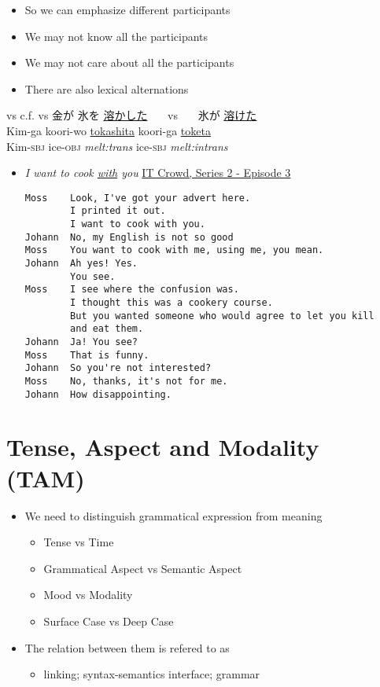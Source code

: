 \documentclass[a4paper,landscape,headrule,footrule,xetex]{foils}
\begin{document}
\begin{itemize}
\item So we can emphasize different participants
\item We may not know all the participants
\item We may not care about all the participants
\item There are also lexical alternations
\end{itemize}
\begin{exe}
\ex {} vs 
\ex c.f.  vs 
\ex \glll 金が 氷を \ul{溶かした}  {~~~vs~~~}  氷が \ul{溶けた} \\ 
Kim-ga koori-wo \ul{tokashita}  {} koori-ga \ul{toketa} \\
  Kim-\textsc{sbj} ice-\textsc{obj} \textit{melt:trans} 
{} ice-\textsc{sbj} \textit{melt:intrans} \\
\end{exe}



\begin{itemize}
\item \textit{I want to cook \ul{with} you}  \href{https://www.youtube.com/watch?v=gOE-q20RcDM}{IT Crowd, Series 2 - Episode 3}
\begin{verbatim}
Moss    Look, I've got your advert here.
        I printed it out.
        I want to cook with you.
Johann  No, my English is not so good 
Moss    You want to cook with me, using me, you mean.
Johann  Ah yes! Yes.
        You see.
Moss    I see where the confusion was.
        I thought this was a cookery course.
        But you wanted someone who would agree to let you kill
        and eat them.
Johann  Ja! You see? 
Moss    That is funny.
Johann  So you're not interested? 
Moss    No, thanks, it's not for me.
Johann  How disappointing.
\end{verbatim}%
\end{itemize}


\section{Tense, Aspect and Modality (TAM)}

\begin{itemize}
\item  We need to distinguish grammatical expression from 
  meaning
  \begin{itemize}
  \item  Tense vs Time
  \item  Grammatical Aspect vs Semantic Aspect
  \item  Mood vs Modality
  \item  Surface Case vs Deep Case
  \end{itemize}
\item  The relation between them is refered to as
  \begin{itemize}
  \item  linking; syntax-semantics interface; grammar
  \end{itemize}
\end{itemize} 
 
\end{document}

